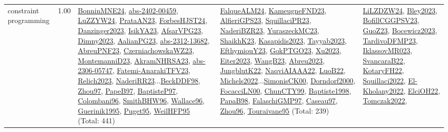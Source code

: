 {\begin{longtable}{p{3cm}r>{\raggedright\arraybackslash}p{6cm}>{\raggedright\arraybackslash}p{6cm}>{\raggedright\arraybackslash}p{8cm}}
\index{constraint programming}\index{CP!constraint programming}constraint programming &  1.00 & \hyperref[detail:BonninMNE24]{BonninMNE24}, \hyperref[detail:abs-2402-00459]{abs-2402-00459}, \hyperref[detail:LuZZYW24]{LuZZYW24}, \hyperref[detail:PrataAN23]{PrataAN23}, \hyperref[detail:ForbesHJST24]{ForbesHJST24}, \hyperref[detail:Danzinger2023]{Danzinger2023}, \hyperref[detail:IsikYA23]{IsikYA23}, \hyperref[detail:AfsarVPG23]{AfsarVPG23}, \hyperref[detail:Dimny2023]{Dimny2023}, \hyperref[detail:AalianPG23]{AalianPG23}, \hyperref[detail:abs-2312-13682]{abs-2312-13682}, \hyperref[detail:AbreuPNF23]{AbreuPNF23}, \hyperref[detail:CzerniachowskaWZ23]{CzerniachowskaWZ23}, \hyperref[detail:MontemanniD23]{MontemanniD23}, \hyperref[detail:AkramNHRSA23]{AkramNHRSA23}, \hyperref[detail:abs-2306-05747]{abs-2306-05747}, \hyperref[detail:Fatemi-AnarakiTFV23]{Fatemi-AnarakiTFV23}, \hyperref[detail:Relich2023]{Relich2023}, \hyperref[detail:NaderiRR23]{NaderiRR23}...\hyperref[detail:BeckDDF98]{BeckDDF98}, \hyperref[detail:Zhou97]{Zhou97}, \hyperref[detail:PapeB97]{PapeB97}, \hyperref[detail:BaptisteP97]{BaptisteP97}, \hyperref[detail:Colombani96]{Colombani96}, \hyperref[detail:SmithBHW96]{SmithBHW96}, \hyperref[detail:Wallace96]{Wallace96}, \hyperref[detail:Guerinik1995]{Guerinik1995}, \hyperref[detail:Puget95]{Puget95}, \hyperref[detail:WeilHFP95]{WeilHFP95} (Total: 441) & \hyperref[detail:FalqueALM24]{FalqueALM24}, \hyperref[detail:KameugneFND23]{KameugneFND23}, \hyperref[detail:AlfieriGPS23]{AlfieriGPS23}, \hyperref[detail:SquillaciPR23]{SquillaciPR23}, \hyperref[detail:NaderiBZR23]{NaderiBZR23}, \hyperref[detail:YuraszeckMC23]{YuraszeckMC23}, \hyperref[detail:ShaikhK23]{ShaikhK23}, \hyperref[detail:Kasapidis2023]{Kasapidis2023}, \hyperref[detail:Tayyab2023]{Tayyab2023}, \hyperref[detail:EfthymiouY23]{EfthymiouY23}, \hyperref[detail:GokPTGO23]{GokPTGO23}, \hyperref[detail:Xu2023]{Xu2023}, \hyperref[detail:Eiter2023]{Eiter2023}, \hyperref[detail:WangB23]{WangB23}, \hyperref[detail:Abreu2023]{Abreu2023}, \hyperref[detail:JungblutK22]{JungblutK22}, \hyperref[detail:NaqviAIAAA22]{NaqviAIAAA22}, \hyperref[detail:LuoB22]{LuoB22}, \hyperref[detail:Michels2022]{Michels2022}...\hyperref[detail:SimonisCK00]{SimonisCK00}, \hyperref[detail:Dorndorf2000]{Dorndorf2000}, \hyperref[detail:FocacciLN00]{FocacciLN00}, \hyperref[detail:ChunCTY99]{ChunCTY99}, \hyperref[detail:Baptiste1998]{Baptiste1998}, \hyperref[detail:PapaB98]{PapaB98}, \hyperref[detail:FalaschiGMP97]{FalaschiGMP97}, \hyperref[detail:Caseau97]{Caseau97}, \hyperref[detail:Zhou96]{Zhou96}, \hyperref[detail:Touraivane95]{Touraivane95} (Total: 239) & \hyperref[detail:LiLZDZW24]{LiLZDZW24}, \hyperref[detail:Bley2023]{Bley2023}, \hyperref[detail:BofillCGGPSV23]{BofillCGGPSV23}, \hyperref[detail:GuoZ23]{GuoZ23}, \hyperref[detail:Bocewicz2023]{Bocewicz2023}, \hyperref[detail:TardivoDFMP23]{TardivoDFMP23}, \hyperref[detail:IklassovMR023]{IklassovMR023}, \hyperref[detail:SvancaraB22]{SvancaraB22}, \hyperref[detail:KotaryFH22]{KotaryFH22}, \hyperref[detail:Squillaci2022]{Squillaci2022}, \hyperref[detail:El-Kholany2022]{El-Kholany2022}, \hyperref[detail:ElciOH22]{ElciOH22}, \hyperref[detail:Tomczak2022]{Tomczak2022}, 
\end{longtable}}
